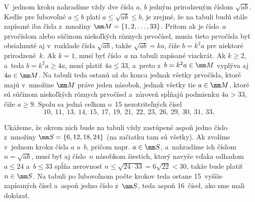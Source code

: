 {%
V~jednom kroku nahradíme vždy dve čísla $a$, $b$ jedným prirodzeným
číslom $\sqrt{ab}$. Keďže pre ľubovoľné
$a\le b$ platí $a\le\sqrt{ab}\le b$,
je zrejmé, že na tabuli
budú stále zapísané iba čísla z~množiny $\mm M=\{1,2,\dots,33\}$.
Pritom ak je číslo~$a$ prvočíslom alebo
súčinom niekoľkých rôznych prvočísel,
musia tieto prvočísla byť obsiahnuté aj v~rozklade čísla $\sqrt{ab}$,
takže $\sqrt{ab}=ka$, čiže $b=k^2a$
pre niektoré prirodzené~$k$. Ak $k=1$, musí byť číslo~$a$
na tabuli zapísané viackrát. Ak $k\ge2$, a~teda
$b=k^2a\ge4a$, musí platiť $4a\le 33$,
a~preto z~$b=k^2a\in\mm M$ vyplýva aj $4a\in\mm M$.
Na tabuli teda ostanú až do konca jednak všetky prvočísla,
ktoré majú v~množine $\mm M$ práve jeden násobok,
jednak všetky tie $a\in\mm M$, ktoré sú súčinom niekoľkých rôznych
prvočísel a~zároveň spĺňajú podmienku $4a>33$, čiže $a\ge 9$.
Spolu sa jedná celkom o~15 nezotriteľných čísel
$$
10,\ 11,\ 13,\ 14,\ 15,\ 17,\ 19,\ 21,\ 22,\ 23,\ 26,\ 29,\ 30,\ 31,\ 33.
$$

Ukážeme, že okrem nich bude na tabuli vždy zastúpené aspoň
jedno číslo z~množiny $\mm S=\{6,12,18,24\}$
(na začiatku tam sú všetky). Ak zvolíme v~jednom kroku čísla $a$
a~$b$, pričom napr. $a\in\mm S$, a~nahradíme ich číslom $n=\sqrt{ab}$,
musí byť aj číslo~$n$ násobkom šiestich, ktorý navyše vďaka odhadom $a\le24$
a~$b\le33$ spĺňa nerovnosť $n\le\sqrt{24\cdot33}=6\sqrt{22}<30$,
takže bude platiť $n\in\mm S$. Na tabuli po ľubovoľnom počte
krokov teda ostane 15~vyššie zapísaných čísel a~aspoň jedno číslo z~$\mm S$,
teda aspoň 16~čísel, ako sme mali dokázať.

}
